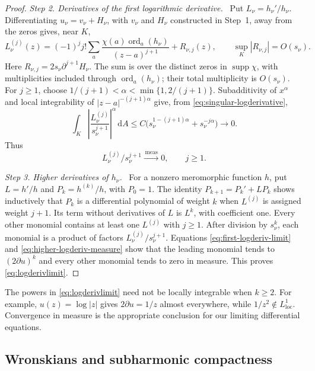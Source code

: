 \documentclass[11pt,letterpaper,reqno]{amsart}
\theoremstyle{remark}
\numberwithin{equation}{section}
\newcommand{\dA}{\,\mathrm dA}
\newcommand{\loc}{\mathrm{loc}}
\newcommand{\convmeas}{\xrightarrow{\,\mathrm{meas}\,}}
\DeclareMathOperator{\supp}{supp}
\DeclareMathOperator{\ord}{ord}
\newcommand{\step}[1]{\medskip\noindent\emph{#1}\ }
\begin{document}
\begin{proof}
\step{Step 2. Derivatives of the first logarithmic derivative.}
Put $L_\nu=h_\nu'/h_\nu$. Differentiating
$u_\nu=v_\nu+H_\nu$, with $v_\nu$ and $H_\nu$ constructed in Step~1,
away from the zeros gives, near $K$,
\begin{equation}\label{eq:singular-logderivative}
 L_\nu^{(j)}(z)=(-1)^jj!\sum_a
 \frac{\chi(a)\ord_a(h_\nu)}{(z-a)^{j+1}}+R_{\nu,j}(z),
 \qquad \sup_K|R_{\nu,j}|=O(s_\nu).
\end{equation}
Here $R_{\nu,j}=2s_\nu\partial^{j+1}H_\nu$. The sum is over the
distinct zeros in $\supp\chi$, with multiplicities included through
$\ord_a(h_\nu)$; their total multiplicity is $O(s_\nu)$.
For $j\ge1$, choose $1/(j+1)<\alpha<\min\{1,2/(j+1)\}$. Subadditivity of
$x^\alpha$ and local integrability of $|z-a|^{-(j+1)\alpha}$ give, from
\eqref{eq:singular-logderivative},
\[
 \int_K\left|\frac{L_\nu^{(j)}}{s_\nu^{j+1}}\right|^\alpha\dA
 \le C\bigl(s_\nu^{1-(j+1)\alpha}+s_\nu^{-j\alpha}\bigr)\longrightarrow0.
\]
Thus
\begin{equation}\label{eq:higher-logderiv-measure}
 L_\nu^{(j)}/s_\nu^{j+1}\convmeas0,\qquad j\ge1.
\end{equation}

\step{Step 3. Higher derivatives of $h_\nu$.}
For a nonzero meromorphic function $h$, put $L=h'/h$ and $P_k=h^{(k)}/h$,
with $P_0=1$. The identity $P_{k+1}=P_k'+LP_k$ shows inductively that $P_k$
is a differential polynomial of weight $k$ when $L^{(j)}$ is assigned weight
$j+1$. Its term without derivatives of $L$ is $L^k$, with coefficient one.
Every other monomial contains at least one $L^{(j)}$ with $j\ge1$.
After division by $s_\nu^k$, each monomial is a product of factors
$L_\nu^{(j)}/s_\nu^{j+1}$. Equations \eqref{eq:first-logderiv-limit} and
\eqref{eq:higher-logderiv-measure} show that the leading monomial tends to
$(2\partial u)^k$ and every other monomial tends to zero in measure. This
proves \eqref{eq:logderivlimit}.
\end{proof}

The powers in \eqref{eq:logderivlimit} need not be locally integrable when
$k\ge2$. For example, $u(z)=\log|z|$ gives $2\partial u=1/z$ almost
everywhere, while $1/z^2\notin L^1_{\loc}$. Convergence in measure is the
appropriate conclusion for our limiting differential equations.

\subsection{Wronskians and subharmonic compactness}
\end{document}
